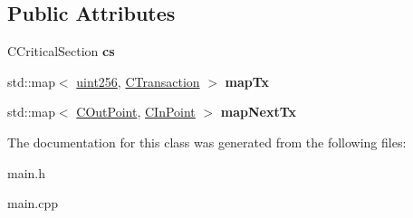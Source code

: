 \subsection*{Public Attributes}
\begin{DoxyCompactItemize}
\item 
\mbox{\label{class_c_tx_mem_pool_ac7ee8c06837c7d2688e2d7e3d071bdbb}} 
C\+Critical\+Section {\bfseries cs}
\item 
\mbox{\label{class_c_tx_mem_pool_a340d4a897e521b7021e6b22cce951beb}} 
std\+::map$<$ \mbox{\hyperlink{classuint256}{uint256}}, \mbox{\hyperlink{class_c_transaction}{C\+Transaction}} $>$ {\bfseries map\+Tx}
\item 
\mbox{\label{class_c_tx_mem_pool_aae6f1162f0b2e42b369971f32a9f71e8}} 
std\+::map$<$ \mbox{\hyperlink{class_c_out_point}{C\+Out\+Point}}, \mbox{\hyperlink{class_c_in_point}{C\+In\+Point}} $>$ {\bfseries map\+Next\+Tx}
\end{DoxyCompactItemize}


The documentation for this class was generated from the following files\+:\begin{DoxyCompactItemize}
\item 
main.\+h\item 
main.\+cpp\end{DoxyCompactItemize}

